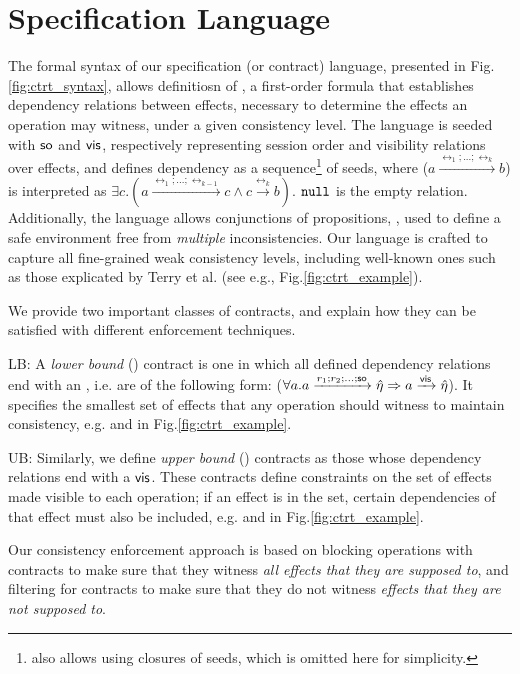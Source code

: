 \section {Specification Language} 
\label{sec:ctrt_language}

The formal syntax of our specification (or contract) language, presented in
Fig.\ref{fig:ctrt_syntax}, allows definitiosn of
\propS{}, a first-order formula
that establishes dependency relations between effects,
necessary to determine the effects an operation may witness, under
a given consistency level.
The language is seeded with ${\textsf{so}}$ and ${\normalfont \textsf{vis}}$, respectively representing session
order and visibility relations over effects, 
and defines dependency \relationS{} as a sequence\footnote{\tool also allows
using closures of seeds, which is omitted here for
simplicity.} of seeds,  
where 
({\footnotesize $a \xrightarrow{\rel_1;...;\rel_k} b$})
is interpreted as 
{\footnotesize$\exists c. (a
\xrightarrow{\rel_1;...;\rel_{k-1}} c
\wedge c \xrightarrow {\rel_k} b)$}.
$\mathtt{null}{}$ is the empty relation.
Additionally, the language allows conjunctions of propositions, \specS{},
used to define a safe environment
free from \emph{multiple} inconsistencies. 
Our language is crafted to capture all fine-grained weak consistency
levels, including well-known ones such as those explicated by Terry et al. \cite{terry}
(see e.g., Fig.\ref{fig:ctrt_example}).

%
We provide two important classes of 
contracts, and explain how they can be
satisfied with different enforcement techniques.
\begin{description}
\item {\textsf LB}: A \emph{lower bound} (\LB{}) contract is one in
  which all defined dependency relations end with an \soZ, i.e. are of
  the following form: ({\footnotesize $\forall a. a
    \xrightarrow{r_1;r_2;...;{\textsf{so}}} \hat{\eta} \Rightarrow a
    \xrightarrow{{\normalfont \textsf{vis}}} \hat{\eta}$}). It specifies the smallest set
  of effects that any operation should witness to maintain
  consistency, e.g.  \rmwCTRT{} and \mrCTRT{} in
  Fig.\ref{fig:ctrt_example}.

\item {\textsf UB}: Similarly, we define \emph{upper bound} (\UB{})
  contracts as those whose dependency relations end with a ${\normalfont \textsf{vis}}$.
  These contracts define constraints on the set of effects made
  visible to each operation; if an effect is in the set, certain
  dependencies of that effect must also be included, e.g.  \visCTRT{}
  and \mwCTRT{} in Fig.\ref{fig:ctrt_example}.
\end{description}
Our consistency enforcement approach is based on blocking operations
with \LB{} contracts to make sure that they witness \emph{all effects
  that they are supposed to}, and filtering for \UB{} contracts to
make sure that they do not witness \emph{effects that they are not
  supposed to}.  
